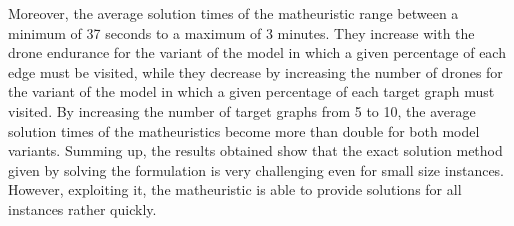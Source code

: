 Moreover, the average solution times of the matheuristic range between a minimum of 37 seconds to a maximum of 3 minutes. They increase with the drone endurance for the variant of the model in which a given percentage of each edge must be visited, while they decrease by increasing the number of drones for the variant of the model in which a given percentage of each target graph must visited. By increasing the number of target graphs from 5 to 10, the average solution times of the matheuristics become more than double for both model variants.
Summing up, the results obtained show that the exact solution method given by solving the formulation is very challenging even for small size instances. However, exploiting it, the matheuristic is able to provide  solutions for all instances rather quickly.



